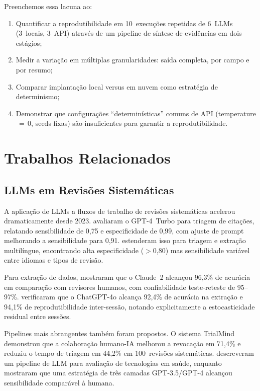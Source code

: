 \documentclass[12pt, a4paper]{article}
\begin{document}
Preenchemos essa lacuna ao:
\begin{enumerate}
  \item Quantificar a reprodutibilidade em 10~execuções repetidas de 6~LLMs (3~locais, 3~API) através de um pipeline de síntese de evidências em dois estágios;
  \item Medir a variação em múltiplas granularidades: saída completa, por campo e por resumo;
  \item Comparar implantação local versus em nuvem como estratégia de determinismo;
  \item Demonstrar que configurações ``determinísticas'' comuns de API (temperature$\,{=}\,$0, seeds fixas) são insuficientes para garantir a reprodutibilidade.
\end{enumerate}


\section{Trabalhos Relacionados}

\subsection{LLMs em Revisões Sistemáticas}

A aplicação de LLMs a fluxos de trabalho de revisões sistemáticas acelerou dramaticamente desde 2023.
\citet{oami2024screening} avaliaram o GPT-4~Turbo para triagem de citações, relatando sensibilidade de 0,75 e especificidade de 0,99, com ajuste de prompt melhorando a sensibilidade para 0,91.
\citet{khraisha2024gpt4} estenderam isso para triagem e extração multilíngue, encontrando alta especificidade ($>$0,80) mas sensibilidade variável entre idiomas e tipos de revisão.

Para extração de dados, \citet{gartlehner2024extraction} mostraram que o Claude~2 alcançou 96,3\% de acurácia em comparação com revisores humanos, com confiabilidade teste-reteste de 95--97\%.
\citet{jensen2025chatgpt} verificaram que o ChatGPT-4o alcança 92,4\% de acurácia na extração e 94,1\% de reprodutibilidade inter-sessão, notando explicitamente a estocasticidade residual entre sessões.

Pipelines mais abrangentes também foram propostos.
O sistema TrialMind~\citep{wang2025trialmind} demonstrou que a colaboração humano-IA melhorou a revocação em 71,4\% e reduziu o tempo de triagem em 44,2\% em 100~revisões sistemáticas.
\citet{li2025jamia} descreveram um pipeline de LLM para avaliação de tecnologias em saúde, enquanto \citet{matsui2024screening} mostraram que uma estratégia de três camadas GPT-3.5/GPT-4 alcançou sensibilidade comparável à humana.
\end{document}
